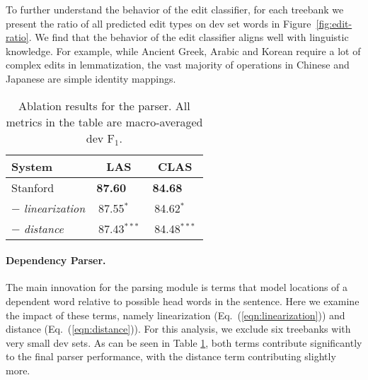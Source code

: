 \documentclass[11pt,a4paper]{article}
\newcommand{\fone}{$\text{F}_1$}
\begin{document}
To further understand the behavior of the edit classifier, for each treebank we present the ratio of all predicted edit types on dev set words in Figure~\ref{fig:edit-ratio}. We find that the behavior of the edit classifier aligns well with linguistic knowledge. For example, while Ancient Greek, Arabic and Korean require a lot of complex edits in lemmatization, the vast majority of operations in Chinese and Japanese are simple identity mappings.



\begin{table}
\centering
\small
\begin{tabular}{lcc}
\toprule
System & LAS & CLAS\\
\midrule
Stanford & \textbf{87.60}$^{\phantom{***}}$ & \textbf{84.68}$^{\phantom{***}}$\\
$-$ \textit{linearization} & 87.55$^{*\phantom{**}}$ & 84.62$^{*\phantom{**}}$\\
$-$ \textit{distance} & 87.43$^{{***}}$ & 84.48$^{{***}}$\\
\bottomrule
\end{tabular}
\caption{Ablation results for the parser. All metrics in the table are macro-averaged dev \fone{}.}
\label{tab:parser_ablation}
\end{table}

\paragraph{Dependency Parser.}
The main innovation for the parsing module is terms that model locations of a dependent word relative to possible head words in the sentence. Here we examine the impact of these terms, namely linearization (Eq.~(\ref{eqn:linearization})) and distance (Eq.~(\ref{eqn:distance})). For this analysis, we exclude six treebanks with very small dev sets. As can be seen in Table \ref{tab:parser_ablation}, both terms contribute significantly to the final parser performance, with the distance term contributing slightly more.
\end{document}
